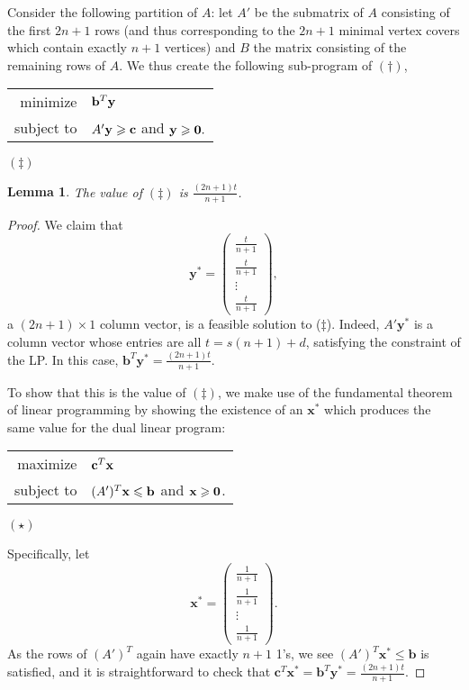 \documentclass[12pt]{amsart}
\renewcommand{\geq}{\geqslant}
\renewcommand{\leq}{\leqslant}
\theoremstyle{plain}
\newtheorem{lem}[theorem]{Lemma}
\theoremstyle{definition}
\begin{document}
Consider the following partition of $A$: let $A'$ be the submatrix of $A$ consisting of the first $2n+1$ rows (and thus corresponding to the $2n+1$ minimal vertex covers which contain exactly $n+1$ vertices) and $B$ the matrix consisting of the remaining rows of $A$.
We thus create the following sub-program of $(\dagger)$,

\begin{tabular}{rl}
		minimize & ${\bf b}^T{\bf y} $\\
		subject to & $A'{\bf y} \geq {\bf c}$ and  ${\bf y} \geq {\bf 0}.$
	\end{tabular}\hspace{2cm}$(\ddagger)$




\begin{lem}\label{lem:alphasubprog}
	The value of $(\ddagger)$ is $\frac{(2n+1)t}{n+1}$.
\end{lem}
\begin{proof}
	We claim that
	\begin{equation}
		\mathbf{y}^* = \left( \begin{matrix} \frac{t}{n+1} \\ \frac{t}{n+1} \\ \vdots \\ \frac{t}{n+1}\end{matrix}\right),
	\end{equation}
	a $(2n+1)\times 1$ column vector, is a feasible solution to ($\ddagger$).
	Indeed, $A'\mathbf{y}^*$ is a column vector whose entries are all $t = s(n+1)+d$, satisfying the constraint of the LP. %
	In this case, $\mathbf{b}^T \mathbf{y}^* = \frac{(2n+1)t}{n+1}$.
	
	To show that this is the value of $(\ddagger)$, we make use of the fundamental theorem of linear programming by showing the existence of an $\mathbf{x}^*$ which produces the same value for the dual linear program:
	
		\begin{tabular}{rl}
maximize & ${\bf c}^T{\bf x} $\\
subject to & $(A')^T{\bf x} \leq {\bf b}$ and  ${\bf x} \geq {\bf 0}$.
\end{tabular}
\hspace{2cm}$(\star)$
	
	
	
	\noindent Specifically, let 
	\[
		\mathbf{x}^* = \left( \begin{matrix} \frac{1}{n+1} \\ \frac{1}{n+1} \\ \vdots \\ \frac{1}{n+1} \end{matrix} \right).
	\]
	As the rows of $(A')^T$ again have exactly $n+1$ 1's, we see $(A')^T \mathbf{x}^* \leq \mathbf{b}$ is satisfied, and it is straightforward to check that $\mathbf{c}^T \mathbf{x}^* = \mathbf{b}^T \mathbf{y}^* = \frac{(2n+1)t}{n+1}$.	
\end{proof}
\end{document}
